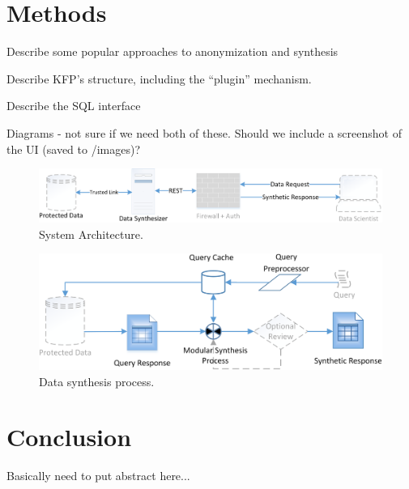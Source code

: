 \documentclass{article}
\begin{document}
\section{Methods}

Describe some popular approaches to anonymization and synthesis

Describe KFP's structure, including the ``plugin'' mechanism.

Describe the SQL interface

Diagrams - not sure if we need both of these. Should we include a screenshot of the UI (saved to /images)?

\begin{figure}[h]
  \centering
  \includegraphics[width=\textwidth]{prototype_architecture}
  \caption{System Architecture.}
\end{figure}

\begin{figure}[h]
  \centering
  \includegraphics[width=\textwidth]{data_synthesis_process}
  \caption{Data synthesis process.}
\end{figure}


\section{Conclusion}

Basically need to put abstract here...




\end{document}
